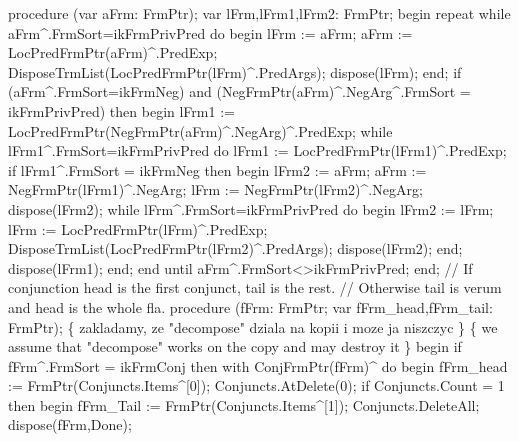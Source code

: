 procedure (var aFrm: FrmPtr);
var
   lFrm,lFrm1,lFrm2: FrmPtr;
begin
   repeat
      while aFrm^.FrmSort=ikFrmPrivPred do
      begin
         lFrm := aFrm;
         aFrm := LocPredFrmPtr(aFrm)^.PredExp;
         DisposeTrmList(LocPredFrmPtr(lFrm)^.PredArgs);
         dispose(lFrm);
      end;
      if (aFrm^.FrmSort=ikFrmNeg) and (NegFrmPtr(aFrm)^.NegArg^.FrmSort = ikFrmPrivPred) then
      begin
         lFrm1 := LocPredFrmPtr(NegFrmPtr(aFrm)^.NegArg)^.PredExp;
         while lFrm1^.FrmSort=ikFrmPrivPred do
            lFrm1 := LocPredFrmPtr(lFrm1)^.PredExp;
         if lFrm1^.FrmSort = ikFrmNeg then
         begin
            lFrm2 := aFrm;
            aFrm := NegFrmPtr(lFrm1)^.NegArg;
            lFrm := NegFrmPtr(lFrm2)^.NegArg;
            dispose(lFrm2);
            while lFrm^.FrmSort=ikFrmPrivPred do
            begin
               lFrm2 := lFrm;
               lFrm := LocPredFrmPtr(lFrm)^.PredExp;
               DisposeTrmList(LocPredFrmPtr(lFrm2)^.PredArgs);
               dispose(lFrm2);
            end;
            dispose(lFrm1);
         end;
      end
   until aFrm^.FrmSort<>ikFrmPrivPred;
end;
\eatline
{}\nwendcode{}\nwdocspar
\nwenddocs{}\endmoddef\nwstartdeflinemarkup{}\nwenddeflinemarkup
// If conjunction head is the first conjunct, tail is the rest.
// Otherwise tail is verum and head is the whole fla.
procedure (fFrm: FrmPtr; var fFrm_head,fFrm_tail: FrmPtr);
\{ zakladamy, ze "decompose" dziala na kopii i moze ja niszczyc \}
\{ we assume that "decompose" works on the copy and may destroy it \}
begin
   if fFrm^.FrmSort = ikFrmConj then
      with ConjFrmPtr(fFrm)^ do
   begin
      fFrm_head := FrmPtr(Conjuncts.Items^[0]);
      Conjuncts.AtDelete(0);
      if Conjuncts.Count = 1 then
      begin fFrm_Tail := FrmPtr(Conjuncts.Items^[1]);
      Conjuncts.DeleteAll; dispose(fFrm,Done);
